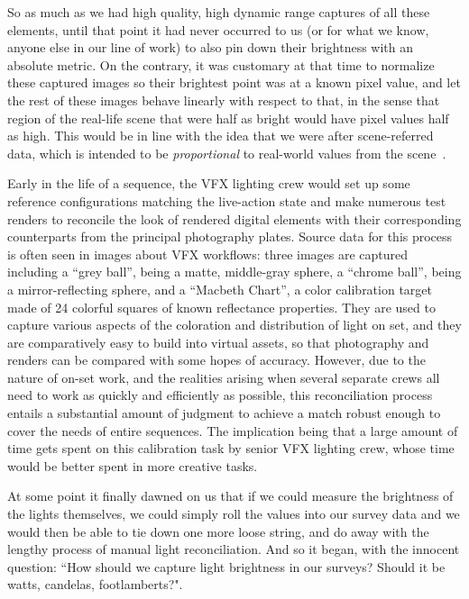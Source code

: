 So as much as we had high quality, high dynamic range captures of all these elements,
until that point it had never occurred to us (or for what we know, anyone else in our
line of work) to also pin down their brightness with an absolute metric. 
On the contrary, it was customary at that time to normalize these captured images so their 
brightest point was at a known pixel value, and let the rest of these images behave linearly 
with respect to that, in the sense that region of the real-life scene that were half as bright
would have pixel values half as high. This would be in line with the idea that we were after 
\gls{scene-referred} data, which is intended to be \emph{proportional} to real-world values from
the scene~\cite{iso:12231-2:2022,iso:22028-1:2016,iec:60050-845:2020,icc:glossary}.

Early in the life of a sequence, the \gls{VFX} lighting crew would set up some reference configurations
matching the live-action state and make numerous test renders to reconcile the look of rendered
digital elements with their corresponding counterparts from the principal photography plates. 
Source data for this process is often seen in images about \gls{VFX} workflows: three images are captured including
a ``grey ball'', being a matte, middle-gray sphere, a ``chrome ball'', being a mirror-reflecting
sphere, and a ``Macbeth Chart'', a color calibration target made of 24 colorful squares of known 
reflectance properties.
They are used to capture various aspects of the coloration and distribution of light on set,
and they are comparatively easy to build into \gls{virtual} assets, so that photography and renders 
can be compared with some hopes of accuracy.
However, due to the nature of on-set work, and the realities arising when several separate crews 
all need to work as quickly and efficiently as possible, this reconciliation process entails a 
substantial amount of judgment to achieve a match robust enough to cover the needs of entire sequences. 
The implication being that a large amount of time gets spent on this calibration task by 
senior \gls{VFX} lighting crew, whose time would be better spent in more creative tasks.

At some point it finally dawned on us that if we could measure the brightness
of the lights themselves, we could simply roll the values into our survey data 
and we would then be able to tie down one more loose string, 
and do away with the lengthy process of manual light reconciliation. 
And so it began, with the innocent question: ``How should we capture light 
brightness in our surveys? Should it be watts, candelas, footlamberts?".

